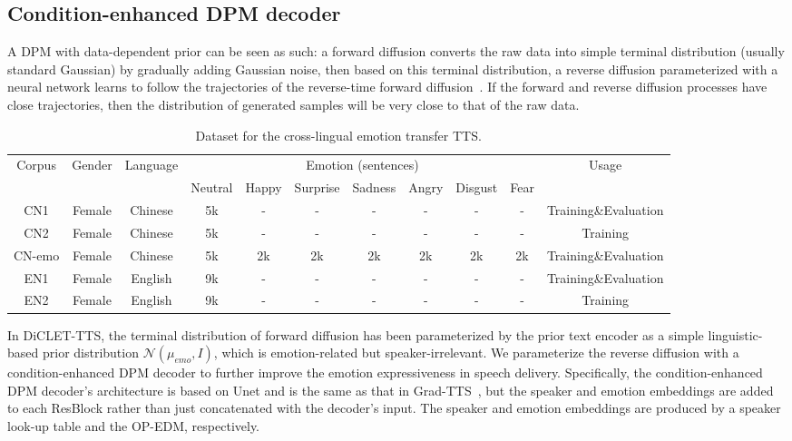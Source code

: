 \documentclass[journal,comsoc]{IEEEtran}
\begin{document}
\subsection{Condition-enhanced DPM decoder}

A DPM with data-dependent prior can be seen as such: a forward diffusion converts the raw data into simple terminal distribution (usually standard Gaussian) by gradually adding Gaussian noise, then based on this terminal distribution, a reverse diffusion parameterized with a neural network learns to follow the trajectories of the reverse-time forward diffusion~\cite{song2020score,popov2021diffusion}.
If the forward and reverse diffusion processes have close trajectories, then the distribution of generated samples will be very close to that of the raw data.

\begin{table*}[h]
\centering
\caption{Dataset for the cross-lingual emotion transfer TTS.}
\setlength{\tabcolsep}{3.0mm}
\label{tab:data}
\begin{tabular}{c|c|c|ccccccc|c}
\toprule
\multirow{2}{*}{Corpus} & \multirow{2}{*}{Gender} & \multirow{2}{*}{Language} & \multicolumn{7}{c|}{Emotion (sentences)}   & \multirow{2}{*}{ Usage} \\
 &    &    & Neutral & Happy  & Surprise &Sadness & Angry & Disgust & Fear &   \\ \midrule
CN1     & Female   & Chinese  &5k   &-    &-     &-    &-   &-   &-       &Training\&Evaluation   \\
CN2     & Female   & Chinese  &5k    &-   &-     &-    &-   &-   &-       &Training               \\
CN-emo  & Female   & Chinese  &5k   &2k    &2k    &2k   &2k  &2k  &2k     &Training\&Evaluation   \\
EN1     & Female   & English  &9k   &-   &-     &-    &-   &-   &-        &Training\&Evaluation   \\ 
EN2     & Female   & English  &9k   &-    &-     &-    &-   &-   &-       &Training   \\ \bottomrule
\end{tabular}
\end{table*}

In DiCLET-TTS, the terminal distribution of forward diffusion has been parameterized by the prior text encoder as a simple linguistic-based prior distribution $\mathcal{N}(\mu_{emo}, I)$, which is emotion-related but speaker-irrelevant. 
We parameterize the reverse diffusion with a condition-enhanced DPM decoder to further improve the emotion expressiveness in speech delivery.
Specifically, the condition-enhanced DPM decoder's architecture is based on Unet and is the same as that in Grad-TTS~\cite{popov2021grad}, but the speaker and emotion embeddings are added to each ResBlock rather than just concatenated with the decoder's input. 
The speaker and emotion embeddings are produced by a speaker look-up table and the OP-EDM, respectively.
\end{document}
